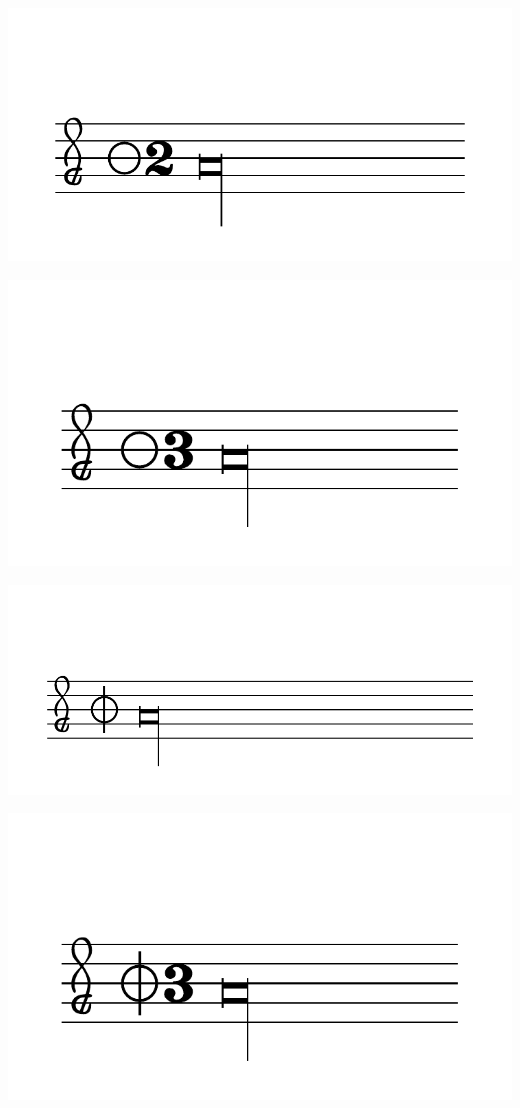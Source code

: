 \documentclass{article}
\begin{document}
        \includegraphics[scale=0.5]{figures_tests/pdf/smens/perfectmeter2.pdf}

        \includegraphics[scale=0.5]{figures_tests/pdf/smens/perfectmeter3.pdf}

        \includegraphics[scale=0.5]{figures_tests/pdf/smens/perfectmeter4.pdf}

        \includegraphics[scale=0.5]{figures_tests/pdf/smens/perfectmeter5.pdf}
\end{document}
